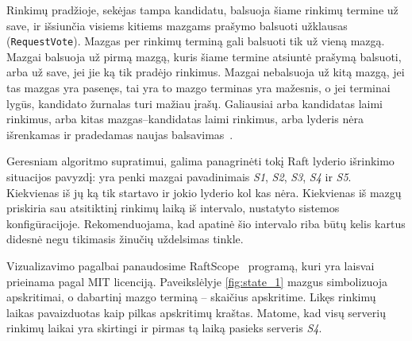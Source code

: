 \documentclass{VUMIFPSkursinis}
\begin{document}
Rinkimų pradžioje, sekėjas tampa kandidatu, balsuoja šiame rinkimų termine už save, ir išsiunčia visiems kitiems mazgams prašymo balsuoti užklausas (\texttt{RequestVote}). Mazgas per rinkimų terminą gali balsuoti tik už vieną mazgą. Mazgai balsuoja už pirmą mazgą, kuris šiame termine atsiuntė prašymą balsuoti, arba už save, jei jie ką tik pradėjo rinkimus. Mazgai nebalsuoja už kitą mazgą, jei tas mazgas yra pasenęs, tai yra to mazgo terminas yra mažesnis, o jei terminai lygūs, kandidato žurnalas turi mažiau įrašų. Galiausiai arba kandidatas laimi rinkimus, arba kitas mazgas--kandidatas laimi rinkimus, arba lyderis nėra išrenkamas ir pradedamas naujas balsavimas~\cite{ongaro_consensus}.

Geresniam algoritmo supratimui, galima panagrinėti tokį Raft lyderio išrinkimo situacijos pavyzdį: yra penki mazgai pavadinimais \textit{S1}, \textit{S2}, \textit{S3}, \textit{S4} ir \textit{S5}. Kiekvienas iš jų ką tik startavo ir jokio lyderio kol kas nėra. Kiekvienas iš mazgų priskiria sau atsitiktinį rinkimų laiką iš intervalo, nustatyto sistemos konfigūracijoje. Rekomenduojama, kad apatinė šio intervalo riba būtų kelis kartus didesnė negu tikimasis žinučių uždelsimas tinkle. 

Vizualizavimo pagalbai panaudosime RaftScope~\cite{ongaro_raftscope_2020} programą, kuri yra laisvai prieinama pagal MIT licenciją. Paveikslėlyje \ref{fig:state_1} mazgus simbolizuoja apskritimai, o dabartinį mazgo terminą -- skaičius apskritime. Likęs rinkimų laikas pavaizduotas kaip pilkas apskritimų kraštas. Matome, kad visų serverių rinkimų laikai yra skirtingi ir pirmas tą laiką pasieks serveris \textit{S4}.
\end{document}
